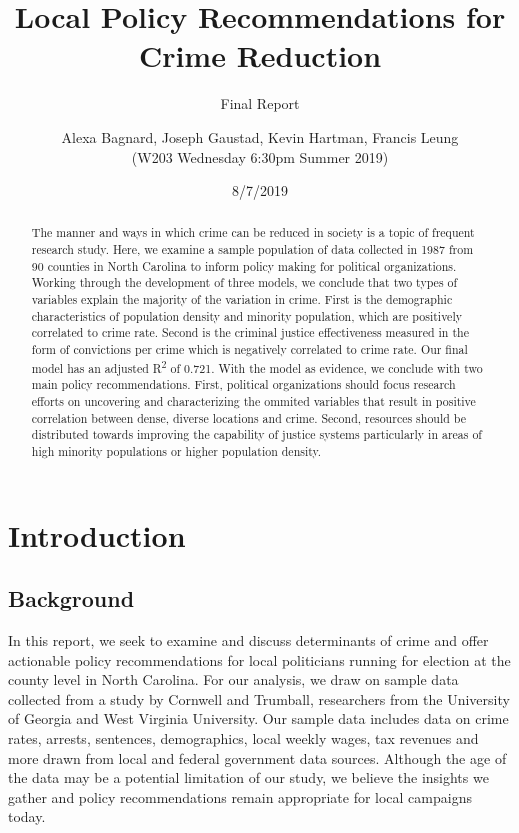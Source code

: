 \documentclass[]{article}
\title{Local Policy Recommendations for Crime Reduction}
\subtitle{Final Report}
\author{Alexa Bagnard, Joseph Gaustad, Kevin Hartman, Francis Leung \\ (W203 Wednesday 6:30pm Summer 2019)}
\date{8/7/2019}
\begin{document}
\maketitle
\begin{abstract}
The manner and ways in which crime can be reduced in society is a topic
of frequent research study. Here, we examine a sample population of data
collected in 1987 from 90 counties in North Carolina to inform policy
making for political organizations. Working through the development of
three models, we conclude that two types of variables explain the
majority of the variation in crime. First is the demographic
characteristics of population density and minority population, which are
positively correlated to crime rate. Second is the criminal justice
effectiveness measured in the form of convictions per crime which is
negatively correlated to crime rate. Our final model has an adjusted
R\textsuperscript{2} of 0.721. With the model as evidence, we conclude
with two main policy recommendations. First, political organizations
should focus research efforts on uncovering and characterizing the
ommited variables that result in positive correlation between dense,
diverse locations and crime. Second, resources should be distributed
towards improving the capability of justice systems particularly in
areas of high minority populations or higher population density.
\end{abstract}

{
\setcounter{tocdepth}{2}
\tableofcontents
}
\hypertarget{introduction}{%
\section{Introduction}\label{introduction}}

\hypertarget{background}{%
\subsection{Background}\label{background}}

In this report, we seek to examine and discuss determinants of crime and
offer actionable policy recommendations for local politicians running
for election at the county level in North Carolina. For our analysis, we
draw on sample data collected from a study by Cornwell and Trumball,
researchers from the University of Georgia and West Virginia University.
Our sample data includes data on crime rates, arrests, sentences,
demographics, local weekly wages, tax revenues and more drawn from local
and federal government data sources. Although the age of the data may be
a potential limitation of our study, we believe the insights we gather
and policy recommendations remain appropriate for local campaigns today.
\end{document}
